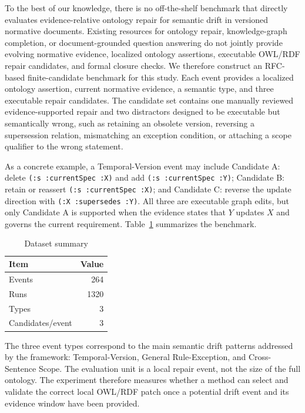 \documentclass[conference]{IEEEtran}
\begin{document}
To the best of our knowledge, there is no off-the-shelf benchmark that directly evaluates evidence-relative ontology repair for semantic drift in versioned normative documents. Existing resources for ontology repair, knowledge-graph completion, or document-grounded question answering do not jointly provide evolving normative evidence, localized ontology assertions, executable OWL/RDF repair candidates, and formal closure checks. We therefore construct an RFC-based finite-candidate benchmark for this study. Each event provides a localized ontology assertion, current normative evidence, a semantic type, and three executable repair candidates. The candidate set contains one manually reviewed evidence-supported repair and two distractors designed to be executable but semantically wrong, such as retaining an obsolete version, reversing a supersession relation, mismatching an exception condition, or attaching a scope qualifier to the wrong statement.

As a concrete example, a Temporal-Version event may include Candidate A: delete \texttt{(:s :currentSpec :X)} and add \texttt{(:s :currentSpec :Y)}; Candidate B: retain or reassert \texttt{(:s :currentSpec :X)}; and Candidate C: reverse the update direction with \texttt{(:X :supersedes :Y)}. All three are executable graph edits, but only Candidate A is supported when the evidence states that $Y$ updates $X$ and governs the current requirement. Table~\ref{tab:dataset} summarizes the benchmark.

\begin{table}[t]
\centering
\caption{Dataset summary}
\label{tab:dataset}
\begin{tabular}{lr}
\toprule
Item & Value \\
\midrule
Events & 264 \\
Runs & 1320 \\
Types & 3 \\
Candidates/event & 3 \\
\bottomrule
\end{tabular}
\end{table}

The three event types correspond to the main semantic drift patterns addressed by the framework: Temporal-Version, General Rule-Exception, and Cross-Sentence Scope. The evaluation unit is a local repair event, not the size of the full ontology. The experiment therefore measures whether a method can select and validate the correct local OWL/RDF patch once a potential drift event and its evidence window have been provided.
\end{document}
